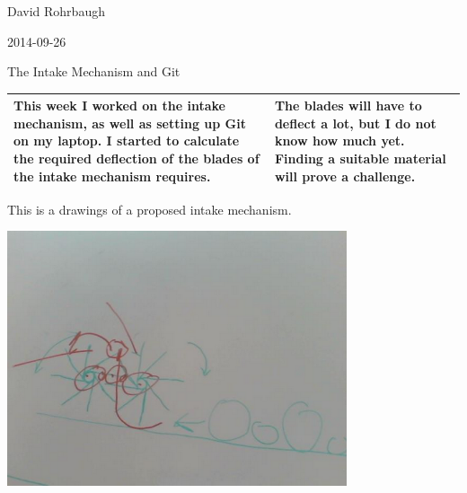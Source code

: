 David Rohrbaugh

2014-09-26

The Intake Mechanism and Git

\begin{tabular}{|p{5cm}|p{5cm}|}
 \hline
 This week I worked on the intake mechanism, as well as setting up Git on my laptop. I started to calculate the required deflection of the blades of the intake mechanism requires.
 &
 The blades will have to deflect a lot, but I do not know how much yet. Finding a suitable material will prove a challenge.
 \\
 \hline
\end{tabular}

\medskip

This is a drawings of a proposed intake mechanism.

\begin{center}
 \includegraphics[width=10cm]{./Entries/Images/intake_device.png}
\end{center}

